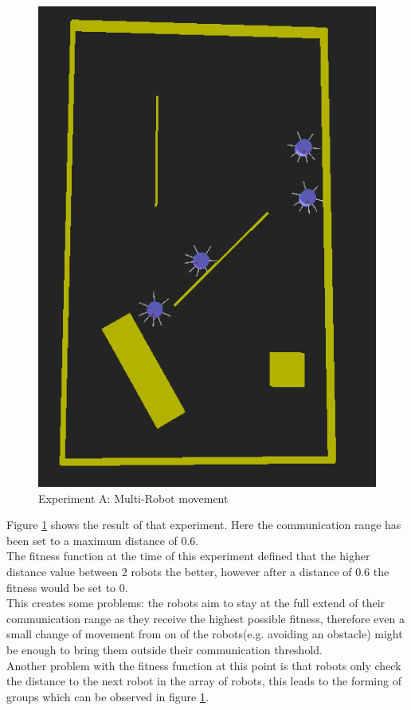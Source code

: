 \begin{figure}[h]
\centering
\includegraphics[scale=0.5]{Chapter4/images/experiment_A.png}
\caption{Experiment A: Multi-Robot movement}
\label{fig:experiment_a}
\end{figure}

Figure \ref{fig:experiment_a} shows the result of that experiment. 
Here the communication range has been set to a maximum distance of 0.6. \\
The fitness function at the time of this experiment defined that the higher distance value between 2 robots the better, however after a distance of 0.6 the fitness would be set to 0.\\
This creates some problems: the robots aim to stay at the full extend of their communication range as they receive the highest possible fitness, therefore even a small change of movement from on of the robots(e.g. avoiding an obstacle) might be enough to bring them outside their communication threshold. \\
Another problem with the fitness function at this point is that robots only check the distance to the next robot in the array of robots, this leads to the forming of groups which can be observed in figure \ref{fig:experiment_a}. \\

